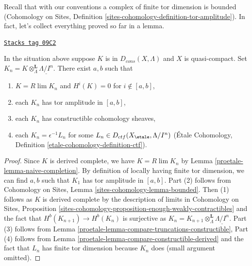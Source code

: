 Recall that with our conventions a complex of finite tor dimension
is bounded (Cohomology on Sites, Definition
\ref{sites-cohomology-definition-tor-amplitude}).
In fact, let's collect everything proved so far in a lemma.

\begin{lemma}
\label{proetale-lemma-describe-constructible-complexes}
\href{https://stacks.math.columbia.edu/tag/09C2}{\texttt{Stacks tag 09C2}}

In the situation above suppose $K$ is in $D_{cons}(X, \Lambda)$
and $X$ is quasi-compact. Set
$K_n = K \otimes_\Lambda^\mathbf{L} \underline{\Lambda/I^n}$.
There exist $a, b$ such that
\begin{enumerate}
\item $K = R\lim K_n$ and $H^i(K) = 0$ for $i \not \in [a, b]$,
\item each $K_n$ has tor amplitude in $[a, b]$,
\item each $K_n$ has constructible cohomology sheaves,
\item each $K_n = \epsilon^{-1}L_n$ for some
$L_n \in D_{ctf}(X_\etale, \Lambda/I^n)$
(\'Etale Cohomology, Definition \ref{etale-cohomology-definition-ctf}).
\end{enumerate}
\end{lemma}

\begin{proof}

Since $K$ is derived complete, we have $K = R\lim K_n$ by
Lemma \ref{proetale-lemma-naive-completion}.
By definition of locally having finite tor dimension, we can find
$a, b$ such that $K_1$ has tor amplitude in $[a, b]$.
Part (2) follows from
Cohomology on Sites, Lemma \ref{sites-cohomology-lemma-bounded}.
Then (1) follows as $K$ is derived complete by the description
of limits in
Cohomology on Sites, Proposition
\ref{sites-cohomology-proposition-enough-weakly-contractibles}
and the fact that $H^b(K_{n + 1}) \to H^b(K_n)$ is surjective
as $K_n = K_{n + 1} \otimes^\mathbf{L}_\Lambda \underline{\Lambda/I^n}$.
Part (3) follows from
Lemma \ref{proetale-lemma-compare-truncations-constructible},
Part (4) follows from
Lemma \ref{proetale-lemma-compare-constructible-derived}
and the fact that $L_n$ has finite tor dimension because $K_n$ does
(small argument omitted).
\end{proof}

